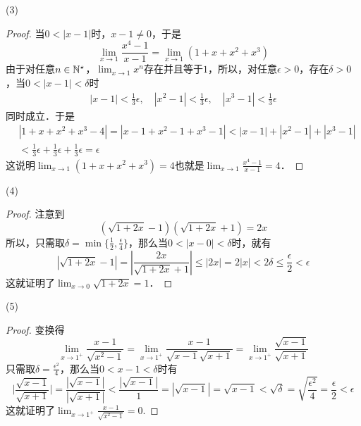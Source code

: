 \noindent (3)
\begin{proof}
当$0 < |x-1|$时，$x-1 \neq 0$，于是
\begin{equation}
    \lim_{x \to 1} \frac{x^4 - 1}{x-1} = \lim_{x \to 1} \left( 1 + x + x^2 + x^3 \right)
\end{equation}
由于对任意$n \in \mathbb{N}^\star$，$\displaystyle\lim_{x \to 1} x^n$存在并且等于$1$，所以，对任意$\epsilon > 0$，存在$\delta > 0$，当$0 < |x - 1| < \delta$时
\begin{align}
    |x-1|< \frac{1}{3}\epsilon, \quad |x^2-1|<\frac{1}{3}\epsilon, \quad |x^3-1|<\frac{1}{3}\epsilon
\end{align}
同时成立．于是
\begin{align}
    &|1+x+x^2+x^3-4| = |x - 1 + x^2 - 1 + x^3 - 1| < |x-1| + |x^2-1| + |x^3 - 1| \\
    &< \frac{1}{3}\epsilon + \frac{1}{3}\epsilon + \frac{1}{3}\epsilon = \epsilon
\end{align}
这说明$\displaystyle\lim_{x \to 1} \left(1 + x + x^2 + x^3\right) = 4$也就是$\displaystyle\lim_{x \to 1} \displaystyle\frac{x^4-1}{x-1} = 4$．
\end{proof}

\noindent (4)
\begin{proof}
注意到
\begin{equation}
    (\sqrt{1+2x} - 1)(\sqrt{1+2x} + 1) = 2x
\end{equation}
所以，只需取$\delta = \min \{ \displaystyle\frac{1}{2}, \frac{\epsilon}{4} \}$，那么当$0 < |x-0| < \delta$时，就有
\begin{equation}
    |\sqrt{1+2x} - 1| = |\frac{2x}{\sqrt{1+2x} + 1}| \leq |2x| = 2|x| < 2\delta \leq \frac{\epsilon}{2} < \epsilon
\end{equation}
这就证明了$\displaystyle\lim_{x \to 0} \sqrt{1+2x} = 1$．
\end{proof}

\noindent (5)
\begin{proof}
变换得
\begin{equation}
    \lim_{x \to 1^+} \frac{x-1}{\sqrt{x^2-1}} = \lim_{x \to 1^+} \frac{x-1}{\sqrt{x-1}\sqrt{x+1}} = \lim_{x \to 1^+} \frac{\sqrt{x-1}}{\sqrt{x+1}}
\end{equation}
只需取$\delta = \displaystyle\frac{\epsilon^2}{4}$，那么当$0 < x - 1 < \delta$时有
\begin{equation}
    \bigg\lvert \frac{\sqrt{x-1}}{\sqrt{x+1}} \bigg\rvert = \frac{|\sqrt{x-1}|}{|\sqrt{x+1}|} < \frac{|\sqrt{x-1}|}{1} = |\sqrt{x-1}| = \sqrt{x-1} < \sqrt{\delta} = \sqrt{\displaystyle\frac{\epsilon^2}{4}} = \frac{\epsilon}{2} < \epsilon
\end{equation}
这就证明了$\displaystyle\lim_{x \to 1^+} \displaystyle\frac{x-1}{\sqrt{x^2-1}} = 0$.
\end{proof}

